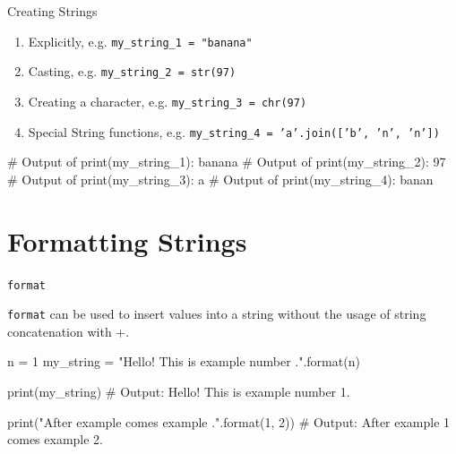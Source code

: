 \begin{frame}[fragile]{Creating Strings}

    \begin{enumerate}
        \item Explicitly, e.g. \texttt{my\_string\_1 = "banana"}
        \item Casting, e.g. \texttt{my\_string\_2 = str(97)}
        \item Creating a character, e.g. \texttt{my\_string\_3 = chr(97)}
        \item Special String functions, \newline e.g. \texttt{my\_string\_4 = 'a'.join(['b', 'n', 'n'])}
    \end{enumerate}

    \begin{pythoncode}
# Output of print(my_string_1): banana
# Output of print(my_string_2): 97
# Output of print(my_string_3): a
# Output of print(my_string_4): banan
    \end{pythoncode}



\end{frame}


\section{Formatting Strings}

\begin{frame}[plain]
    \sectionpage
\end{frame}

\begin{frame}[fragile]{\texttt{format}}

    \texttt{format} can be used to insert values into a string without the usage of string concatenation with +.

    \begin{pythoncode}
n = 1
my_string = "Hello! This is example number {}.".format(n)

print(my_string)
# Output: Hello! This is example number 1.

print("After example {} comes example {}.".format(1, 2))
# Output: After example 1 comes example 2.

    \end{pythoncode}




\end{frame}

